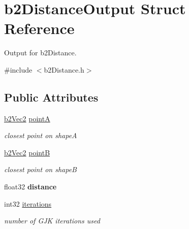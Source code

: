 \hypertarget{structb2_distance_output}{\section{b2\-Distance\-Output Struct Reference}
\label{structb2_distance_output}
}


Output for b2\-Distance.  




{\ttfamily \#include $<$b2\-Distance.\-h$>$}

\subsection*{Public Attributes}
\begin{DoxyCompactItemize}
\item 
\hypertarget{structb2_distance_output_a7e0f1f44a64e596dc7d37570c69eefce}{\hyperlink{structb2_vec2}{b2\-Vec2} \hyperlink{structb2_distance_output_a7e0f1f44a64e596dc7d37570c69eefce}{point\-A}}\label{structb2_distance_output_a7e0f1f44a64e596dc7d37570c69eefce}

\begin{DoxyCompactList}\small\item\em closest point on shape\-A \end{DoxyCompactList}\item 
\hypertarget{structb2_distance_output_aa85beca17337a506cd4a924d0c6f92cc}{\hyperlink{structb2_vec2}{b2\-Vec2} \hyperlink{structb2_distance_output_aa85beca17337a506cd4a924d0c6f92cc}{point\-B}}\label{structb2_distance_output_aa85beca17337a506cd4a924d0c6f92cc}

\begin{DoxyCompactList}\small\item\em closest point on shape\-B \end{DoxyCompactList}\item 
\hypertarget{structb2_distance_output_ae67f480ff37d4ab732e6366f485c7f55}{float32 {\bfseries distance}}\label{structb2_distance_output_ae67f480ff37d4ab732e6366f485c7f55}

\item 
\hypertarget{structb2_distance_output_ae2d4c84dd3d05ea4f4d20c91099ec8d5}{int32 \hyperlink{structb2_distance_output_ae2d4c84dd3d05ea4f4d20c91099ec8d5}{iterations}}\label{structb2_distance_output_ae2d4c84dd3d05ea4f4d20c91099ec8d5}

\begin{DoxyCompactList}\small\item\em number of G\-J\-K iterations used \end{DoxyCompactList}\end{DoxyCompactItemize}


